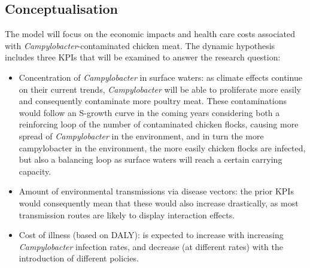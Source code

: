 \subsection{Conceptualisation}
\label{s:conceptualisation}
The model will focus on the economic impacts and health care costs associated with \textit{Campylobacter}-contaminated chicken meat. The dynamic hypothesis includes three KPIs that will be examined to answer the research question: 
\begin{itemize}
    \item Concentration of \textit{Campylobacter} in surface waters: as climate effects continue on their current trends, \textit{Campylobacter} will be able to proliferate more easily and consequently contaminate more poultry meat. These contaminations would follow an S-growth curve in the coming years considering both a reinforcing loop of the number of contaminated chicken flocks, causing more spread of \textit{Campylobacter} in the environment, and in turn the more campylobacter in the environment, the more easily chicken flocks are infected, but also a balancing loop as surface waters will reach a certain carrying capacity. %
    \item Amount of environmental transmissions via disease vectors: the prior KPIs would consequently mean that these would also increase drastically, as most transmission routes are likely to display interaction effects.
    \item Cost of illness (based on DALY): is expected to increase with increasing \textit{Campylobacter} infection rates, and decrease (at different rates) with the introduction of different policies.
\end{itemize}
 

